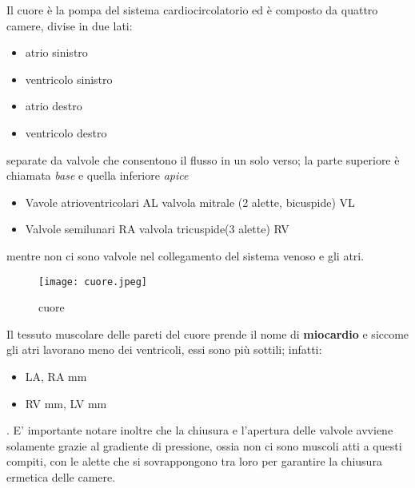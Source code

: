 \documentclass[10pt]{article}
\begin{document}
Il cuore è la pompa del sistema cardiocircolatorio ed è composto da quattro camere, divise in due lati:
\begin{itemize}
    \item atrio sinistro
    \item ventricolo sinistro
    \item atrio destro
    \item ventricolo destro
\end{itemize}
separate da valvole che consentono il flusso in un solo verso; la parte superiore è chiamata \emph{base} e quella inferiore \emph{apice}
\begin{itemize}
    \item Vavole atrioventricolari 
    \subitem  AL \textrightarrow valvola mitrale (2  alette, bicuspide) \textrightarrow VL 
    \item Valvole semilunari
    \subitem RA \textrightarrow valvola tricuspide(3 alette) \textrightarrow RV
\end{itemize}
mentre non ci sono valvole nel collegamento del sistema venoso e gli atri.

\begin{figure}
\centering
\texttt{[image: cuore.jpeg]}
\caption{cuore}
\label{fig:cuore}
\end{figure}

Il tessuto muscolare delle pareti del cuore prende il nome di \textbf{miocardio} e siccome gli atri lavorano meno dei ventricoli, essi sono più sottili; infatti:
\begin{itemize}
    \item  LA, RA  mm
    \item RV  mm, LV  mm
\end{itemize}.
E' importante notare inoltre che la chiusura e l'apertura delle valvole avviene solamente grazie al gradiente di pressione, ossia non ci sono muscoli atti a questi compiti, con le alette che si sovrappongono tra loro per garantire la chiusura ermetica delle camere.
\end{document}
